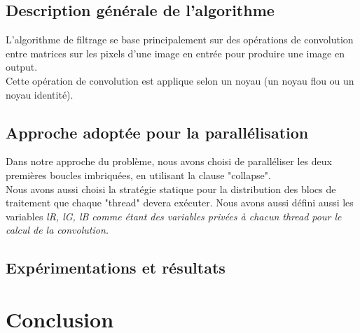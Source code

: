\documentclass{report}
\begin{document}
\section{Description générale de l'algorithme}
L'algorithme de filtrage se base principalement sur des opérations de convolution entre matrices
 sur les pixels d'une image en entrée pour produire une image en output.\\
Cette opération de convolution est applique selon un noyau (un noyau flou ou un noyau identité).
\section{Approche adoptée pour la parallélisation }
Dans notre approche du problème, nous avons choisi de paralléliser les deux premières
boucles imbriquées, en utilisant la clause "collapse".\\
Nous avons aussi choisi la stratégie statique pour la distribution des blocs de traitement
que chaque "thread" devera exécuter. Nous avons aussi défini aussi les variables \it{lR, lG, lB} 
comme étant des variables privées à chacun thread pour le calcul de la convolution.
\section{Expérimentations et résultats}
\chapter{Conclusion}
\end{document}
